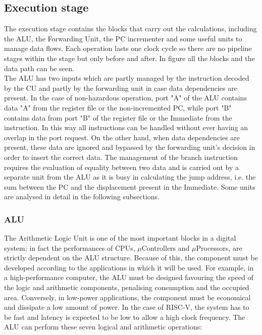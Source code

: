 \subsection{Execution stage}
The execution stage contains the blocks that carry out the calculations, including the ALU, the Forwarding Unit, the PC incrementer and some useful units to manage data flows. Each operation lasts one clock cycle so there are no pipeline stages within the stage but only before and after. In figure  all the blocks and the data path can be seen.\\
The ALU has two inputs which are partly managed by the instruction decoded by the CU and partly by the forwarding unit in case data dependencies are present. In the case of non-hazardous operation, port "A" of the ALU contains data "A" from the register file or the non-incremented PC, while port "B" contains data from port "B" of the register file or the Immediate from the instruction. In this way all instructions can be handled without ever having an overlap in the port request. On the other hand, when data dependencies are present, these data are ignored and bypassed by the forwarding unit's decision in order to insert the correct data. The management of the branch instruction requires the evaluation of equality between two data and is carried out by a separate unit from the ALU as it is busy in calculating the jump address, i.e. the sum between the PC and the displacement present in the Immediate. Some units are analysed in detail in the following subsections.

\subsubsection{ALU}
The Arithmetic Logic Unit is one of the most important blocks in a digital system; in fact the performances of CPUs, $\mu$Controllers and $\mu$Processors, are strictly dependent on the ALU structure. Because of this, the component must be developed according to the applications in which it will be used. For example, in a high-performance computer, the ALU must be designed favouring the speed of the logic and arithmetic components, penalising consumption and the occupied area. Conversely, in low-power applications, the component must be economical and dissipate a low amount of power. In the case of RISC-V, the system has to be fast and latency is expected to be low to allow a high clock frequency.  The ALU can perform these seven logical and arithmetic operations:

